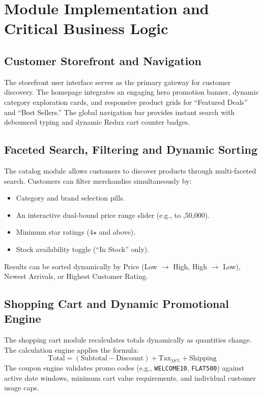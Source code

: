 \section{Module Implementation and Critical Business Logic}

\subsection{Customer Storefront and Navigation}
The storefront user interface serves as the primary gateway for customer discovery. The homepage integrates an engaging hero promotion banner, dynamic category exploration cards, and responsive product grids for ``Featured Deals'' and ``Best Sellers.'' The global navigation bar provides instant search with debounced typing and dynamic Redux cart counter badges.

\subsection{Faceted Search, Filtering and Dynamic Sorting}
The catalog module allows customers to discover products through multi-faceted search. Customers can filter merchandise simultaneously by:
\begin{itemize}[leftmargin=2.0em]
    \item Category and brand selection pills.
    \item An interactive dual-bound price range slider (e.g.,  to ,50,000).
    \item Minimum star ratings (4$\star$ and above).
    \item Stock availability toggle (``In Stock'' only).
\end{itemize}
Results can be sorted dynamically by Price (Low $\rightarrow$ High, High $\rightarrow$ Low), Newest Arrivals, or Highest Customer Rating.

\subsection{Shopping Cart and Dynamic Promotional Engine}
The shopping cart module recalculates totals dynamically as quantities change. The calculation engine applies the formula:
\begin{equation}
\text{Total} = (\text{Subtotal} - \text{Discount}) + \text{Tax}_{18\%} + \text{Shipping}
\end{equation}
The coupon engine validates promo codes (e.g., \texttt{WELCOME10}, \texttt{FLAT500}) against active date windows, minimum cart value requirements, and individual customer usage caps.

